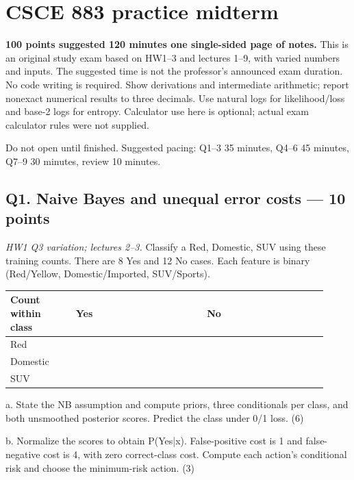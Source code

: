 \documentclass[11pt]{article}
\begin{document}
\section*{CSCE 883 practice midterm}

\textbf{100 points \textbullet{} suggested 120 minutes \textbullet{} one single-sided page of notes.} This is an original study exam based on HW1–3 and lectures 1–9, with varied numbers and inputs. The suggested time is not the professor's announced exam duration. No code writing is required. Show derivations and intermediate arithmetic; report nonexact numerical results to three decimals. Use natural logs for likelihood/\allowbreak{}loss and base-2 logs for entropy. Calculator use here is optional; actual exam calculator rules were not supplied.

Do not open  until finished. Suggested pacing: Q1–3 35 minutes, Q4–6 45 minutes, Q7–9 30 minutes, review 10 minutes.

\subsection*{Q1. Naive Bayes and unequal error costs — 10 points}

\emph{HW1 Q3 variation; lectures 2–3.} Classify a Red, Domestic, SUV using these training counts. There are 8 Yes and 12 No cases. Each feature is binary (Red/\allowbreak{}Yellow, Domestic/\allowbreak{}Imported, SUV/\allowbreak{}Sports).

{\small\setlength{\tabcolsep}{3pt}\renewcommand{\arraystretch}{1.25}
\begin{longtable}{>{\raggedright\arraybackslash}p{0.19\linewidth}>{\raggedright\arraybackslash}p{0.38\linewidth}>{\raggedright\arraybackslash}p{0.35\linewidth}}
\toprule
Count within class & Yes & No \\
\midrule\endhead
Red & 6 & 3 \\
Domestic & 2 & 9 \\
SUV & 4 & 8 \\
\bottomrule\end{longtable}}

a. State the NB assumption and compute priors, three conditionals per class, and both unsmoothed posterior scores. Predict the class under 0/\allowbreak{}1 loss. (6)

b. Normalize the scores to obtain P(Yes|x). False-positive cost is 1 and false-negative cost is 4, with zero correct-class cost. Compute each action's conditional risk and choose the minimum-risk action. (3)
\end{document}
